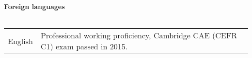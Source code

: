 \textbf{Foreign languages}
\\
\\
\begin{tabular}{p{}|p{}}
English&
Professional working proficiency, Cambridge CAE (CEFR C1) exam passed in 2015.\\
\end{tabular}